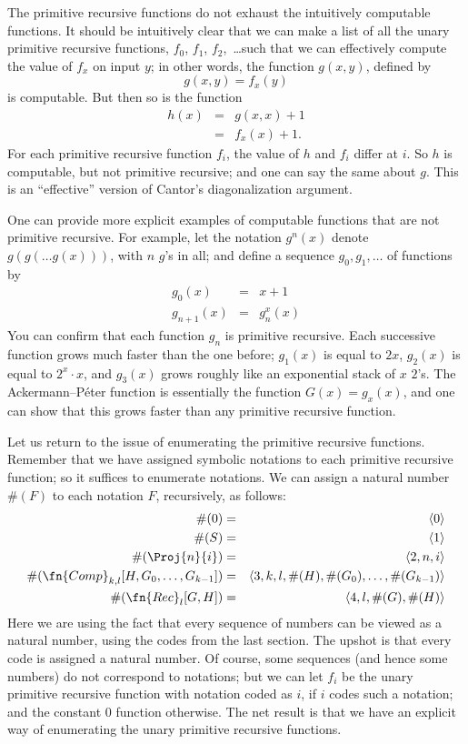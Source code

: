 \documentclass[../../../include/open-logic-section]{subfiles}
\begin{document}

The primitive recursive functions do not exhaust the intuitively
computable functions. It should be intuitively clear that we can make
a list of all the unary primitive recursive functions,
$f_0$, $f_1$, $f_2$,~\dots such that we can effectively compute the value of
$f_x$ on input $y$; in other words, the function $g(x,y)$, defined by
\[
g(x,y) = f_x(y)
\]
is computable. But then so is the function
\begin{eqnarray*}
h(x) & = & g(x,x) + 1 \\
& = & f_x(x) +1.
\end{eqnarray*}
For each primitive recursive function $f_i$, the value of $h$ and
$f_i$ differ at $i$. So $h$ is computable, but not primitive
recursive; and one can say the same about $g$. This is an
``effective'' version of Cantor's diagonalization argument.

One can provide more explicit examples of computable functions that
are not primitive recursive. For example, let the notation $g^n(x)$
denote $g(g(\dots g(x)))$, with $n$ $g$'s in all; and define a
sequence $g_0,g_1,\dots$ of functions by
\begin{eqnarray*}
g_0(x) & = & x+1 \\
g_{n + 1}(x) & = & g_n^x(x)
\end{eqnarray*}
You can confirm that each function $g_n$ is primitive recursive. Each
successive function grows much faster than the one before; $g_1(x)$ is
equal to $2x$, $g_2(x)$ is equal to $2^x \cdot x$, and $g_3(x)$ grows
roughly like an exponential stack of $x$ $2$'s. The Ackermann--P\'eter
function is essentially the function $G(x) = g_x(x)$, and one can show
that this grows faster than any primitive recursive function.

Let us return to the issue of enumerating the primitive recursive
functions. Remember that we have assigned symbolic notations to each
primitive recursive function; so it suffices to enumerate
notations. We can assign a natural number $\#(F)$ to each notation $F$,
recursively, as follows:
\begin{eqnarray*}
\#(0) & = & \langle 0 \rangle \\
\#(S) & = & \langle 1 \rangle \\
\#(\Proj{n}{i}) & = & \langle 2, n, i \rangle \\
\#(\fn{Comp}_{k,l}[H,G_0,\dots,G_{k-1}]) & = & \langle
3,k,l,\#(H),\#(G_0),\dots,\#(G_{k-1}) \rangle \\
\#(\fn{Rec}_l[G,H]) & = & \langle 4, l, \#(G), \#(H) \rangle
\end{eqnarray*}
Here we are using the fact that every sequence of numbers can be viewed
as a natural number, using the codes from the last section. The upshot
is that every code is assigned a natural number. Of course, some
sequences (and hence some numbers) do not correspond to notations; but
we can let $f_i$ be the unary primitive recursive function with
notation coded as $i$, if $i$ codes such a notation; and the constant
$0$ function otherwise. The net result is that we have an explicit way of
enumerating the unary primitive recursive functions.
\end{document}
